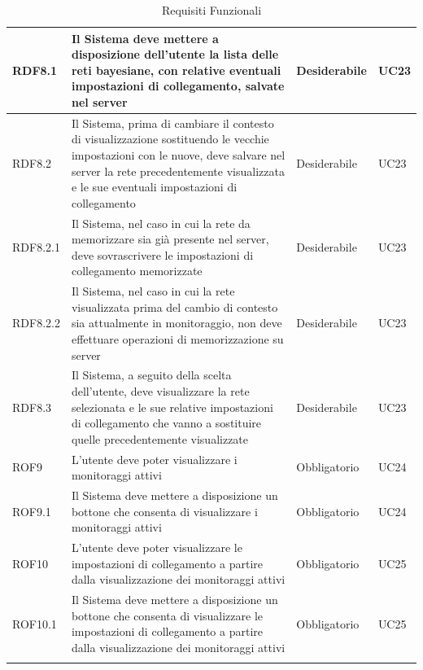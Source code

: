 \begin{center}
\begin{longtable}[c]{|m{}|m{}|m{}|m{}|}
\hline
RDF8.1 & Il Sistema deve mettere a disposizione dell'utente la lista delle reti bayesiane, con relative eventuali impostazioni di collegamento, salvate nel server & Desiderabile & UC23\\
\hline
RDF8.2 & Il Sistema, prima di cambiare il contesto di visualizzazione sostituendo le vecchie impostazioni con le nuove, deve salvare nel server la rete precedentemente visualizzata e le sue eventuali impostazioni di collegamento & Desiderabile & UC23\\
\hline
RDF8.2.1 & Il Sistema, nel caso in cui la rete da memorizzare sia già presente nel server, deve sovrascrivere le impostazioni di collegamento memorizzate & Desiderabile & UC23\\
\hline
RDF8.2.2 & Il Sistema, nel caso in cui la rete visualizzata prima del cambio di contesto sia attualmente in monitoraggio, non deve effettuare operazioni di memorizzazione su server & Desiderabile & UC23\\
\hline
RDF8.3 & Il Sistema, a seguito della scelta dell'utente, deve visualizzare la rete selezionata e le sue relative impostazioni di collegamento che vanno a sostituire quelle precedentemente visualizzate & Desiderabile & UC23\\
\hline
ROF9 & L'utente deve poter visualizzare i monitoraggi attivi & Obbligatorio & UC24\\
\hline
ROF9.1 & Il Sistema deve mettere a disposizione un bottone che consenta di visualizzare i monitoraggi attivi & Obbligatorio & UC24\\
\hline
ROF10 & L'utente deve poter visualizzare le impostazioni di collegamento a partire dalla visualizzazione dei monitoraggi attivi & Obbligatorio & UC25\\
\hline
ROF10.1 & Il Sistema deve mettere a disposizione un bottone che consenta di visualizzare le impostazioni di collegamento a partire dalla visualizzazione dei monitoraggi attivi & Obbligatorio & UC25\\
\hline
\caption{Requisiti Funzionali}
\end{longtable}
\end{center}


